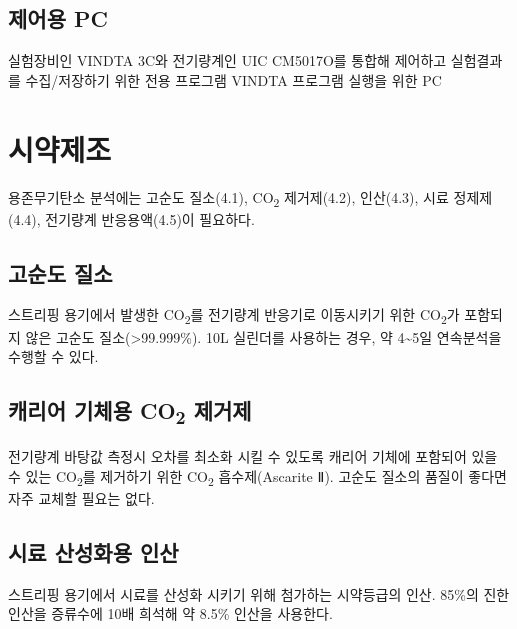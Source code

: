 \documentclass[
]{book}
\begin{document}
\hypertarget{uxc81cuxc5b4uxc6a9-pc}{%
\subsection{제어용 PC}\label{uxc81cuxc5b4uxc6a9-pc}}

실험장비인 VINDTA 3C와 전기량계인 UIC CM5017O를 통합해 제어하고 실험결과를 수집/저장하기 위한 전용 프로그램 VINDTA 프로그램 실행을 위한 PC

\hypertarget{uxc2dcuxc57duxc81cuxc870-6}{%
\section{시약제조}\label{uxc2dcuxc57duxc81cuxc870-6}}

용존무기탄소 분석에는 고순도 질소(4.1), CO\textsubscript{2} 제거제(4.2), 인산(4.3), 시료 정제제(4.4), 전기량계 반응용액(4.5)이 필요하다.

\hypertarget{uxace0uxc21cuxb3c4-uxc9c8uxc18c}{%
\subsection{고순도 질소}\label{uxace0uxc21cuxb3c4-uxc9c8uxc18c}}

스트리핑 용기에서 발생한 CO\textsubscript{2}를 전기량계 반응기로 이동시키기 위한 CO\textsubscript{2}가 포함되지 않은 고순도 질소(\textgreater99.999\%). 10L 실린더를 사용하는 경우, 약 4\textasciitilde5일 연속분석을 수행할 수 있다.

\hypertarget{uxce90uxb9acuxc5b4-uxae30uxccb4uxc6a9-co2-uxc81cuxac70uxc81c}{%
\subsection{\texorpdfstring{캐리어 기체용 CO\textsubscript{2} 제거제}{캐리어 기체용 CO2 제거제}}\label{uxce90uxb9acuxc5b4-uxae30uxccb4uxc6a9-co2-uxc81cuxac70uxc81c}}

전기량계 바탕값 측정시 오차를 최소화 시킬 수 있도록 캐리어 기체에 포함되어 있을 수 있는 CO\textsubscript{2}를 제거하기 위한 CO\textsubscript{2} 흡수제(Ascarite Ⅱ). 고순도 질소의 품질이 좋다면 자주 교체할 필요는 없다.

\hypertarget{uxc2dcuxb8cc-uxc0b0uxc131uxd654uxc6a9-uxc778uxc0b0}{%
\subsection{시료 산성화용 인산}\label{uxc2dcuxb8cc-uxc0b0uxc131uxd654uxc6a9-uxc778uxc0b0}}

스트리핑 용기에서 시료를 산성화 시키기 위해 첨가하는 시약등급의 인산. 85\%의 진한 인산을 증류수에 10배 희석해 약 8.5\% 인산을 사용한다.
\end{document}
